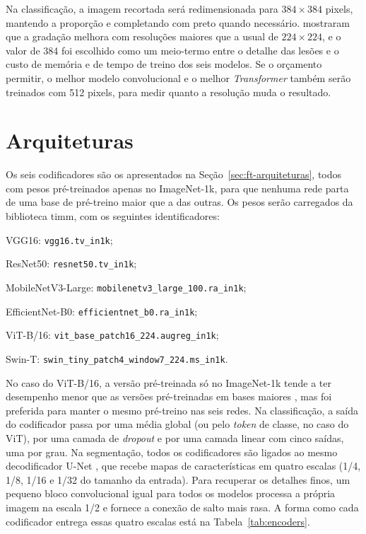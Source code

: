 Na classificação, a imagem recortada será redimensionada para $384 \times 384$ pixels, mantendo a proporção e completando com preto quando necessário.  mostraram que a gradação melhora com resoluções maiores que a usual de $224 \times 224$, e o valor de 384 foi escolhido como um meio-termo entre o detalhe das lesões e o custo de memória e de tempo de treino dos seis modelos. Se o orçamento permitir, o melhor modelo convolucional e o melhor \textit{Transformer} também serão treinados com 512 pixels, para medir quanto a resolução muda o resultado.

\section{Arquiteturas}
\label{sec:met-arquiteturas}

Os seis codificadores são os apresentados na Seção~\ref{sec:ft-arquiteturas}, todos com pesos pré-treinados apenas no ImageNet-1k, para que nenhuma rede parta de uma base de pré-treino maior que a das outras. Os pesos serão carregados da biblioteca timm, com os seguintes identificadores:

\begin{alineas}
	\item VGG16: \texttt{vgg16.tv\_in1k};
	\item ResNet50: \texttt{resnet50.tv\_in1k};
	\item MobileNetV3-Large: \texttt{mobilenetv3\_large\_100.ra\_in1k};
	\item EfficientNet-B0: \texttt{efficientnet\_b0.ra\_in1k};
	\item ViT-B/16: \texttt{vit\_base\_patch16\_224.augreg\_in1k};
	\item Swin-T: \texttt{swin\_tiny\_patch4\_window7\_224.ms\_in1k}.
\end{alineas}

No caso do ViT-B/16, a versão pré-treinada só no ImageNet-1k tende a ter desempenho menor que as versões pré-treinadas em bases maiores \cite{dosovitskiy2021vit}, mas foi preferida para manter o mesmo pré-treino nas seis redes. Na classificação, a saída do codificador passa por uma média global (ou pelo \textit{token} de classe, no caso do ViT), por uma camada de \textit{dropout} e por uma camada linear com cinco saídas, uma por grau. Na segmentação, todos os codificadores são ligados ao mesmo decodificador U-Net \cite{ronneberger2015unet}, que recebe mapas de características em quatro escalas (1/4, 1/8, 1/16 e 1/32 do tamanho da entrada). Para recuperar os detalhes finos, um pequeno bloco convolucional igual para todos os modelos processa a própria imagem na escala 1/2 e fornece a conexão de salto mais rasa. A forma como cada codificador entrega essas quatro escalas está na Tabela~\ref{tab:encoders}.


